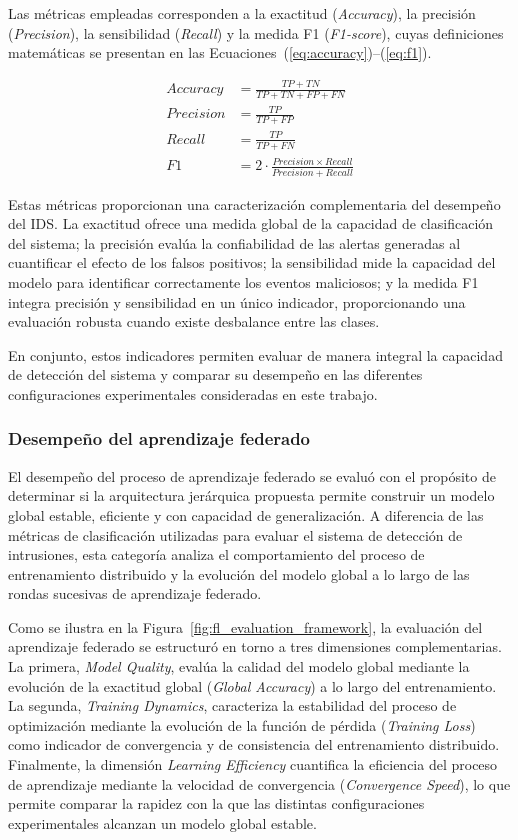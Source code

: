 \documentclass[journal,article,submit,moreauthors]{Definitions/mdpi}
\begin{document}
Las métricas empleadas corresponden a la exactitud (\textit{Accuracy}), la precisión (\textit{Precision}), la sensibilidad (\textit{Recall}) y la medida F1 (\textit{F1-score}), cuyas definiciones matemáticas se presentan en las Ecuaciones~(\ref{eq:accuracy})--(\ref{eq:f1}).

\begin{align}
Accuracy &= \frac{TP+TN}{TP+TN+FP+FN}
\label{eq:accuracy}\\[2mm]
Precision &= \frac{TP}{TP+FP}
\label{eq:precision}\\[2mm]
Recall &= \frac{TP}{TP+FN}
\label{eq:recall}\\[2mm]
F1 &= 2\cdot\frac{Precision \times Recall}{Precision+Recall}
\label{eq:f1}
\end{align}

Estas métricas proporcionan una caracterización complementaria del desempeño del IDS. La exactitud ofrece una medida global de la capacidad de clasificación del sistema; la precisión evalúa la confiabilidad de las alertas generadas al cuantificar el efecto de los falsos positivos; la sensibilidad mide la capacidad del modelo para identificar correctamente los eventos maliciosos; y la medida F1 integra precisión y sensibilidad en un único indicador, proporcionando una evaluación robusta cuando existe desbalance entre las clases.

En conjunto, estos indicadores permiten evaluar de manera integral la capacidad de detección del sistema y comparar su desempeño en las diferentes configuraciones experimentales consideradas en este trabajo.

\subsubsection{Desempeño del aprendizaje federado}
El desempeño del proceso de aprendizaje federado se evaluó con el propósito de determinar si la arquitectura jerárquica propuesta permite construir un modelo global estable, eficiente y con capacidad de generalización. A diferencia de las métricas de clasificación utilizadas para evaluar el sistema de detección de intrusiones, esta categoría analiza el comportamiento del proceso de entrenamiento distribuido y la evolución del modelo global a lo largo de las rondas sucesivas de aprendizaje federado.

Como se ilustra en la Figura~\ref{fig:fl_evaluation_framework}, la evaluación del aprendizaje federado se estructuró en torno a tres dimensiones complementarias. La primera, \textit{Model Quality}, evalúa la calidad del modelo global mediante la evolución de la exactitud global (\textit{Global Accuracy}) a lo largo del entrenamiento. La segunda, \textit{Training Dynamics}, caracteriza la estabilidad del proceso de optimización mediante la evolución de la función de pérdida (\textit{Training Loss}) como indicador de convergencia y de consistencia del entrenamiento distribuido. Finalmente, la dimensión \textit{Learning Efficiency} cuantifica la eficiencia del proceso de aprendizaje mediante la velocidad de convergencia (\textit{Convergence Speed}), lo que permite comparar la rapidez con la que las distintas configuraciones experimentales alcanzan un modelo global estable.
\end{document}
